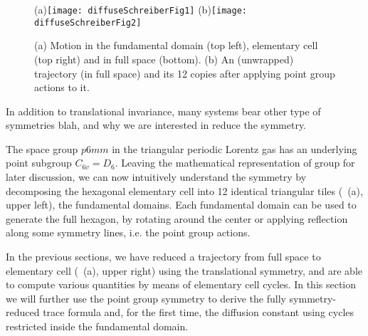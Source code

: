 


\begin{figure}[htbp]
  \begin{center}
    (a)\texttt{[image: diffuseSchreiberFig1]}
    (b)\texttt{[image: diffuseSchreiberFig2]}
  \end{center}
  \caption[]{\label{fig-schrieberFig12}
  (a)\;\; Motion in the fundamental domain (top left), elementary cell (top
      right) and  in full space (bottom).
  (b) An (unwrapped) trajectory (in full  space) and its 12 copies after
      applying point group actions to it.
  }
\end{figure}

In addition to translational invariance, many systems bear other type of symmetries blah, and why we are interested in reduce the symmetry. 

The space group $p6mm$ in the triangular periodic Lorentz gas has an underlying point subgroup $C_{6v}=D_6$. Leaving the mathematical representation of group for later discussion, we can now intuitively understand the symmetry by decomposing the hexagonal elementary cell into 12 identical triangular tiles (~(a), upper left), the fundamental domains. Each fundamental domain can be used to generate the full hexagon, by rotating around the center or applying reflection along some symmetry lines, i.e. the point group actions.


In the previous sections, we have reduced a trajectory from full space to elementary cell (~(a), upper right) using the translational symmetry, and are able to compute various quantities by means of elementary cell cycles. In this section we will further use the point group symmetry to derive the fully symmetry-reduced trace formula and, for the first time, the diffusion constant using cycles restricted inside the fundamental domain.


